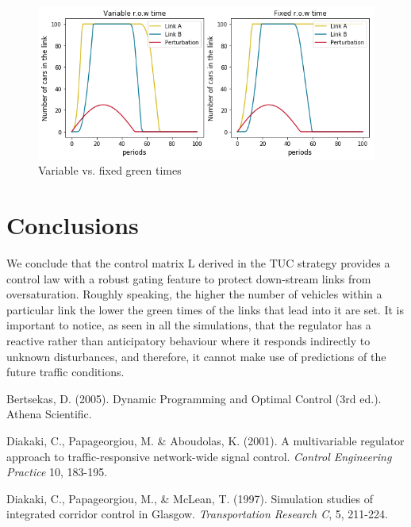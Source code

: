 \documentclass[11pt]{article}
\begin{document}
\begin{figure}[h!]
    \caption{Variable vs. fixed green times}
      \centering
	\includegraphics[width=12cm]{sim9}
\end{figure}

\section{Conclusions}

We conclude that the control matrix L derived in the TUC strategy provides a control law with a robust gating feature to protect down-stream links from oversaturation. Roughly speaking, the higher the number of vehicles within a particular link the lower the green times of the links that lead into it are set. It is important to notice, as seen in all the simulations, that the regulator has a reactive rather than anticipatory behaviour where it responds indirectly to unknown disturbances, and therefore, it cannot make use of predictions of the future traffic conditions. 
 \clearpage

\begin{thebibliography}{9}
Bertsekas, D. (2005). Dynamic Programming and Optimal Control (3rd ed.). Athena Scientific.

Diakaki, C., Papageorgiou, M. \& Aboudolas, K. (2001).
A multivariable regulator approach to traffic-responsive network-wide signal control.
\textit{Control Engineering Practice} 10, 183-195.

Diakaki, C., Papageorgiou, M., \& McLean, T. (1997). Simulation studies of integrated corridor control in Glasgow. 
\textit{Transportation Research C}, 5, 211-224.

\end{thebibliography}

\end{document}
